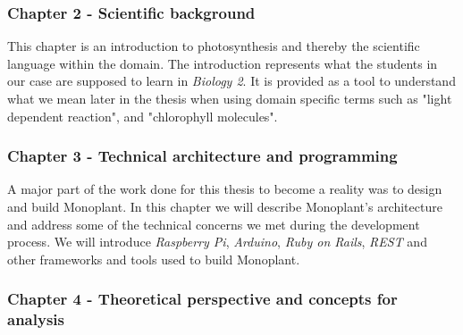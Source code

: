 \subsubsection*{Chapter 2 - Scientific background}
This chapter is an introduction to photosynthesis and thereby the scientific language within the domain. The introduction represents what the students in our case are supposed to learn in \emph{Biology 2}. It is provided as a tool to understand what we mean later in the thesis when using domain specific terms such as "light dependent reaction", and "chlorophyll molecules".

\subsubsection*{Chapter 3 - Technical architecture and programming}
A major part of the work done for this thesis to become a reality was to design and build Monoplant. In this chapter we will describe Monoplant's architecture and address some of the technical concerns we met during the development process. We will introduce \emph{Raspberry Pi}, \emph{Arduino}, \emph{Ruby on Rails}, \emph{REST} and other frameworks and tools used to build Monoplant.

\subsubsection*{Chapter 4 - Theoretical perspective and concepts for analysis}


